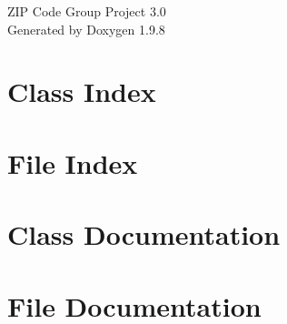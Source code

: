 \documentclass[twoside]{book}
\newcommand{\+}{\discretionary{\mbox{\scriptsize$\hookleftarrow$}}{}{}}
\newcommand{\clearemptydoublepage}{%
    \newpage{\pagestyle{empty}\cleardoublepage}%
  }
\begin{document}
  \raggedbottom
    \hypersetup{pageanchor=false,
                bookmarksnumbered=true,
                pdfencoding=unicode
               }
  \begin{titlepage}
  \vspace*{7cm}
  \begin{center}%
  {\Large ZIP Code Group Project 3.\+0}\\
  \vspace*{1cm}
  {\large Generated by Doxygen 1.9.8}\\
  \end{center}
  \end{titlepage}
  \clearemptydoublepage
  \tableofcontents
  \clearemptydoublepage
  \hypersetup{pageanchor=true}
\chapter{Class Index}

\chapter{File Index}

\chapter{Class Documentation}











\chapter{File Documentation}














  \backmatter
  \newpage
  \clearemptydoublepage
  \printindex
\end{document}
